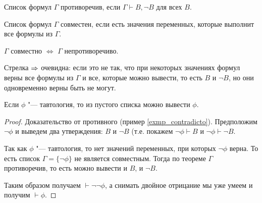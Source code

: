 \begin{Def}
	Список формул $\Gamma$ противоречив, если $\Gamma \vdash B, \lnot B$ для всех $B$.
\end{Def}

\begin{Def}
	Список формул $\Gamma$ совместен, если есть значения переменных, которые выполнит все формулы из $\Gamma$.
\end{Def}

\begin{theorem}\label{correct_full_strong}
	$\Gamma$ совместно $\iff$ $\Gamma$ непротиворечиво.
\end{theorem}
\begin{Rem}
	Стрелка $\Rightarrow$ очевидна: если это не так, что при некоторых значениях формул верны все формулы из $\Gamma$ и все, которые можно вывести,
	то есть $B$ и $\lnot B$, но они одновременно верны быть не могут.
\end{Rem}
\begin{conseq}
	Если $\phi$ "--- тавтология, то из пустого списка можно вывести $\phi$.
\end{conseq}
\begin{proof}
	Доказательство от противного (пример \ref{exmp_contradicto}).
	Предположим $\lnot \phi$ и выведем два утверждения: $B$ и $\lnot B$ (т.е. покажем $\lnot \phi \vdash B$ и $\lnot \phi \vdash \lnot B$.

	Так как $\phi$ "--- тавтология, то нет значений переменных, при которых $\lnot \phi$ верна.
	То есть список $\Gamma=\{ \lnot \phi \}$ не является совместным.
	Тогда по теореме $\Gamma$ противоречив, то есть можно вывести и $B$, и $\lnot B$.

	Таким образом получаем $\vdash \lnot \lnot \phi$, а снимать двойное отрицание мы уже умеем и получим $\vdash \phi$.
\end{proof}
